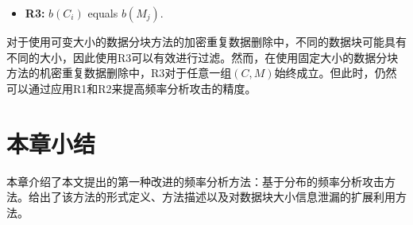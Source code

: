 \begin{itemize}[leftmargin=*]
    \item {\bf R3:} $b({C_i})$ equals $b({M_j})$.
\end{itemize}

对于使用可变大小的数据分块方法的加密重复数据删除中，不同的数据块可能具有不同的大小，因此使用R3可以有效进行过滤。然而，在使用固定大小的数据分块方法的机密重复数据删除中，R3对于任意一组$(C, M)$始终成立。但此时，仍然可以通过应用R1和R2来提高频率分析攻击的精度。
     

\section{本章小结}

本章介绍了本文提出的第一种改进的频率分析方法：基于分布的频率分析攻击方法。给出了该方法的形式定义、方法描述以及对数据块大小信息泄漏的扩展利用方法。                  



